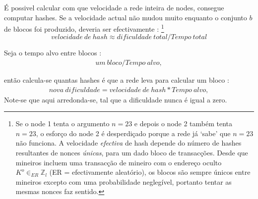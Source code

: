 É possivel calcular com que velocidade a rede inteira de nodes, consegue computar hashes. Se a velocidade actual não mudou muito enquanto o conjunto $b$ de blocos foi produzido, deveria ser efectivamente :
\footnote{Se o node 1 tenta o argumento $n = 23$ e depois o node 2 também tenta $n = 23$, o esforço do node 2 é desperdiçado porque a rede já `sabe' que $n = 23$ não funciona. A velocidade {\em efectiva} de hash depende do número de hashes resultantes de nonces {\em únicas}, para um dado bloco de transacções. Desde que mineiros incluem uma transacção de mineiro com o endereço oculto $K^o \in_{ER} \mathbb{Z}_l$ (ER = efectivamente aleatório), os blocos são sempre únicos entre mineiros excepto com uma probabilidade neglegível, portanto tentar as mesmas nonces faz sentido.}
\vspace{.175cm}           
\[\mathit{velocidade\ de\ hash} \approx \mathit{dificuldade\ total}/\mathit{Tempo\ total}\]



Seja o tempo alvo entre blocos :  
\begin{align*}
um\ bloco/Tempo\ alvo ,
\end{align*}

então calcula-se quantas hashes é que a rede leva para calcular um bloco : 
\begin{align*}
\mathit{nova\ dificuldade} = \mathit{velocidade\ de\ hash}*\mathit{Tempo\ alvo} ,
\end{align*}
Note-se que aqui arredonda-se, tal que a dificuldade nunca é igual a zero.



